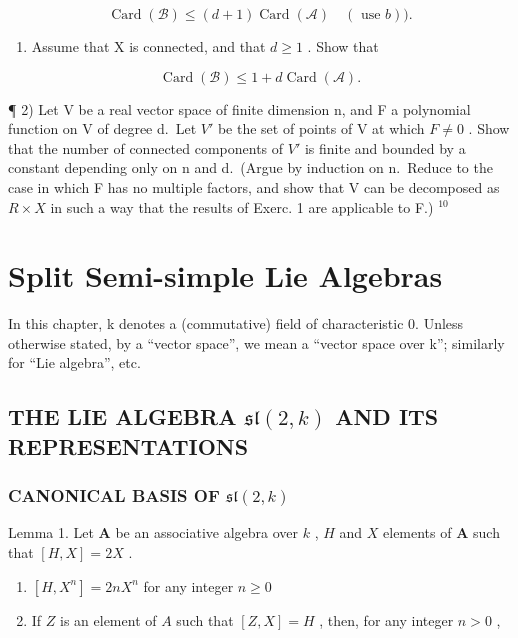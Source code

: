\[
\operatorname{Card} (\mathscr {B}) \leq (d + 1) \operatorname{Card} (\mathscr {A}) \quad (\text { use   } b)).
\]

\begin{enumerate}
\def\labelenumi{\alph{enumi})}
\setcounter{enumi}{3}
\tightlist
\item
  Assume that X is connected, and that \(d \geq 1\) . Show that
\end{enumerate}

\[
\operatorname{Card} (\mathcal {B}) \leq 1 + d \operatorname{Card} (\mathcal {A}).
\]

¶ 2) Let V be a real vector space of finite dimension n, and F a polynomial function on V of degree d.~Let \(V'\) be the set of points of V at which \(F \neq 0\) . Show that the number of connected components of \(V'\) is finite and bounded by a constant depending only on n and d.~(Argue by induction on n.~Reduce to the case in which F has no multiple factors, and show that V can be decomposed as \(R \times X\) in such a way that the results of Exerc. 1 are applicable to F.) \(^{10}\)

\chapter{Split Semi-simple Lie Algebras}

In this chapter, k denotes a (commutative) field of characteristic 0. Unless otherwise stated, by a ``vector space'', we mean a ``vector space over k''; similarly for ``Lie algebra'', etc.

\section{\texorpdfstring{THE LIE ALGEBRA \(\mathfrak{sl}(2,k)\) AND ITS REPRESENTATIONS}{THE LIE ALGEBRA \textbackslash mathfrak\{sl\}(2,k) AND ITS REPRESENTATIONS}}

\subsection{\texorpdfstring{CANONICAL BASIS OF \(\mathfrak{sl}(2,k)\)}{CANONICAL BASIS OF \textbackslash mathfrak\{sl\}(2,k)}}

Lemma 1. Let \(\mathbf{A}\) be an associative algebra over \(k\) , \(H\) and \(X\) elements of \(\mathbf{A}\) such that \([H, X] = 2X\) .

\begin{enumerate}
\def\labelenumi{(\roman{enumi})}
\item
  \([H,X^n ] = 2nX^n\) for any integer \(n\geq 0\)
\item
  If \(Z\) is an element of \(A\) such that \([Z, X] = H\) , then, for any integer \(n > 0\) ,
\end{enumerate}

